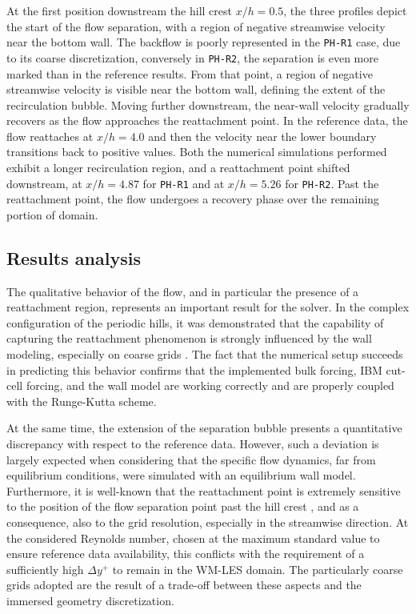 \documentclass[12pt, a4paper, twoside, openright]{book}
\begin{document}
At the first position downstream the hill crest $x/h = 0.5$, the three profiles depict the start of the flow separation, with a region of negative streamwise velocity near the bottom wall. The backflow is poorly represented in the \texttt{PH-R1} case, due to its coarse discretization, conversely in \texttt{PH-R2}, the separation is even more marked than in the reference results. From that point, a region of negative streamwise velocity is visible near the bottom wall, defining the extent of the recirculation bubble. Moving further downstream, the near-wall velocity gradually recovers as the flow approaches the reattachment point. In the reference data, the flow reattaches at $x/h = 4.0$ and then the velocity near the lower boundary transitions back to positive values. Both the numerical simulations performed exhibit a longer recirculation region, and a reattachment point shifted downstream, at $x/h = 4.87$ for \texttt{PH-R1} and at $x/h = 5.26$ for \texttt{PH-R2}. Past the reattachment point, the flow undergoes a recovery phase over the remaining portion of domain.

\subsection{Results analysis}
The qualitative behavior of the flow, and in particular the presence of a reattachment region, represents an important result for the solver. In the complex configuration of the periodic hills, it was demonstrated that the capability of capturing the reattachment phenomenon is strongly influenced by the wall modeling, especially on coarse grids \cite{breuer}. The fact that the numerical setup succeeds in predicting this behavior confirms that the implemented bulk forcing, IBM cut-cell forcing, and the wall model are working correctly and are properly coupled with the Runge-Kutta scheme.

At the same time, the extension of the separation bubble presents a quantitative discrepancy with respect to the reference data. However, such a deviation is largely expected when considering that the specific flow dynamics, far from equilibrium conditions, were simulated with an equilibrium wall model. Furthermore, it is well-known that the reattachment point is extremely sensitive to the position of the flow separation point past the hill crest \cite{cinnella, breuer}, and as a consequence, also to the grid resolution, especially in the streamwise direction. At the considered Reynolds number, chosen at the maximum standard value to ensure reference data availability, this conflicts with the requirement of a sufficiently high $\Delta y^+$ to remain in the WM-LES domain. The particularly coarse grids adopted are the result of a trade-off between these aspects and the immersed geometry discretization.
\end{document}
